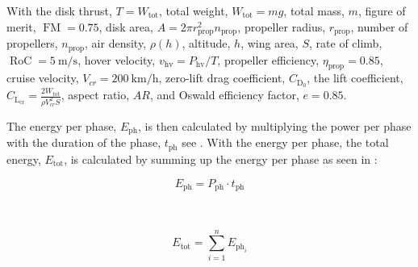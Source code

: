 
With the disk thrust, $T=W_{\text{tot}}$, total weight, $W_{\text{tot}}=mg$, total mass, $m$, figure of merit, $\operatorname{FM}=0.75$, disk area, $A=2\pi r_{\text{prop}}^2n_{\text{prop}}$, propeller radius, $r_{\text{prop}}$, number of propellers, $n_{\text{prop}}$, air density, $\rho(h)$, altitude, $h$, wing area, $S$, rate of climb, $\operatorname{RoC}=\qty{5}{\m\per\s}$, hover velocity, $v_{\text{hv}}=P_{\text{hv}}/T$, propeller efficiency, $\eta_{\text{prop}}=0.85$, cruise velocity, $V_{cr}=\qty{200}{\km\per\hour}$,  zero-lift drag coefficient, $C_{\text{D}_0}$, the lift coefficient, $C_{\text{L}_{\text{cr}}}=\frac{2W_{\text{tot}}}{\rho V_{cr}^2 S}$, aspect ratio, $AR$, and Oswald efficiency factor, $e=0.85$.

The energy per phase, $E_{\text{ph}}$, is then calculated by multiplying the power per phase with the duration of the phase, $t_{\text{ph}}$ see . With the energy per phase, the total energy, $E_{\text{tot}}$, is calculated by summing up the energy per phase as seen in :

\begin{minipage}{.45\linewidth}
\begin{equation}
\label{eq:phasepow}
    E_{\text{ph}} = P_{\text{ph}} \cdot t_{\text{ph}}
\end{equation}
\end{minipage}
~
\begin{minipage}{.45\linewidth}
\begin{equation}
    \label{eq:totpow}
    E_{\text{tot}} = \sum_{i=1}^{n} E_{\text{ph}_i}
\end{equation}
\end{minipage}

